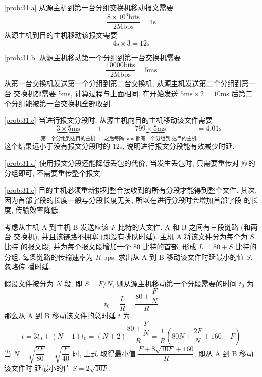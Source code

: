 \documentclass[boxes]{homework}
\begin{document}
\begin{solution}
    \ref{prob:31.a} 从源主机到第一台分组交换机移动报文需要
    \begin{equation}
        \frac{ 8 \times 10^{6} \text{bits} }{ 2\text{Mbps} } = 4 \text{s}
    \end{equation}
    从源主机到目的主机移动该报文需要
    \begin{equation}
        4\text{s} \times 3 = 12 \text{s}
    \end{equation}

    \ref{prob:31.b} 从源主机移动第一个分组到第一台交换机需要
    \begin{equation}
        \frac{ 10000 \text{bits} }{ 2\text{Mbps} } = 5\text{ms}
    \end{equation}
    从第一台交换机发送第一个分组到第二台交换机, 从源主机发送第二个分组到第一台
    交换机都需要 5ms, 计算过程与上面相同. 在开始发送 $5\text{ms}\times 2 = 10
        \text{ms}$ 后第二个分组能被第一台交换机全部收到.

    \ref{prob:31.c} 当进行报文分段时, 从源主机向目的主机移动该文件需要
    \begin{equation}
        \underbrace{ 3\times 5\text{ms} }_{\text{第一个分组到达目的主机}} +
        \underbrace{ 799 \times 5\text{ms} }_{\text{之后每隔 5ms 都有一个分组到
                达目的主机}} = 4.01\text{s}
    \end{equation}
    这个结果远小于没有报文分段时的 12s, 说明进行报文分段能有效减少时延.

    \ref{prob:31.d} 使用报文分段还能降低丢包的代价, 当发生丢包时, 只需要重传对
    应的分组即可, 不需要重传整个报文.

    \ref{prob:31.e} 目的主机必须重新排列整合接收到的所有分段才能得到整个文件.
    其次, 因为首部字段的长度一般与分段长度无关, 所以在进行分段时会增加首部字段
    的长度, 传输效率降低.
\end{solution}

\begin{problem}
考虑从主机 A 到主机 B 发送应该 $F$ 比特的大文件. A 和 B 之间有三段链路 (和两台
交换机), 并且该链路不拥塞 (即没有排队时延). 主机 A 将该文件分为每个为 $S$ 比特
的报文段, 并为每个报文段增加一个 80 比特的首部, 形成 $L = 80 + S$ 比特的分组.
每条链路的传输速率为 $R$ bps. 求出从 A 到 B 移动该文件时延最小的值 $S$. 忽略传
播时延.
\end{problem}
\begin{solution}
    假设文件被分为 $N$ 段, 即 $S = F / N$, 则从源主机移动第一个分段需要的时间
    $t_{0}$ 为
    \begin{equation}
        t_{0} = \frac{ L }{ R } = \frac{ 80 + \dfrac{ F }{ N } }{ R }
    \end{equation}
    那么从 A 到 B 移动该文件的总时延 $t$ 为
    \begin{equation}
        t = 3t_{0} + (N - 1)t_{0} = (N + 2) \frac{ 80 + \dfrac{ F }{ N } }{ R }
        = \frac{ 1 }{ R } \left( 80N + \frac{ 2F }{ N } + 160 + F\right)
    \end{equation}
    当 $N = \sqrt{ \dfrac{ 2F }{ 80 } } = \sqrt{ \dfrac{ F }{ 40 } }$ 时, 上式
    取得最小值 $\dfrac{ F + 8 \sqrt{10F} + 160 }{ R }$, 即从 A 到 B 移动该文件时
    延最小的值 $S = 2 \sqrt{10F}$.
\end{solution}
\end{document}
